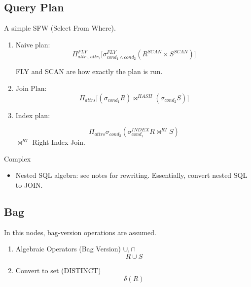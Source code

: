 \documentclass{article}
\begin{document}
\subsection{Query Plan}
A simple SFW (Select From Where). 
\begin{enumerate}
\item Naive plan:
$$
\Pi_{attr_1,attr_2}^{FLY}\Big[\sigma_{cond_1\wedge cond_2}^{FLY} (R^{SCAN}\times S^{SCAN})\Big]
$$

FLY and SCAN are how exactly the plan is run. 

\item Join Plan:
$$
\Pi_{attrs} \Big[(\sigma_{cond_1}R)  \bowtie^{HASH} (\sigma_{cond_2}S) \Big]
$$
\item Index plan:

$$
\Pi_{attrs}\sigma_{cond_2}(\sigma_{cond_1}^{INDEX}R \bowtie^{RI} S)
$$
$\bowtie^{RI}$ Right Index Join. 

\end{enumerate}
Complex
\begin{itemize}
\item Nested SQL algebra: see notes for rewriting. Essentially, convert nested SQL to JOIN.
\end{itemize}

\subsection{Bag}
In this nodes, bag-version operations are assumed. 
\begin{enumerate}
\item Algebraic Operators (Bag Version) $\cup, \cap$
$$
R\cup S
$$
\item Convert to set (DISTINCT)
$$
\delta(R)
$$
\end{enumerate}
\end{document}
